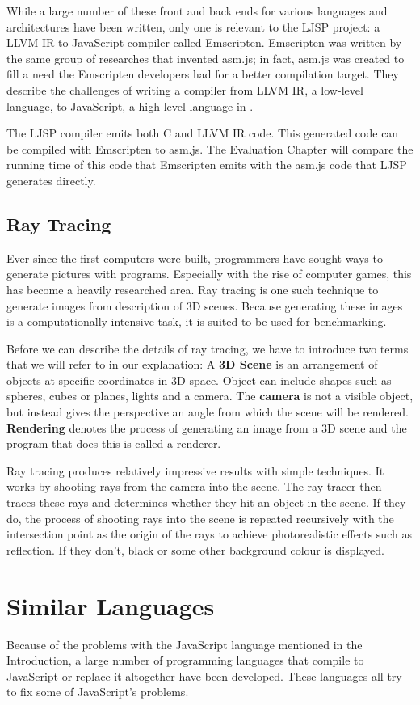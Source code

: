 \documentclass[11pt]{report}
\begin{document}
While a large number of these front and back ends for various languages and architectures have been written, only one is relevant to the LJSP project: a LLVM IR to JavaScript compiler called Emscripten. Emscripten was written by the same group of researches that invented asm.js; in fact, asm.js was created to fill a need the Emscripten developers had for a better compilation target. They describe the challenges of writing a compiler from LLVM IR, a low-level language, to JavaScript, a high-level language in \cite{emscriptenpapar}.

The LJSP compiler emits both C and LLVM IR code. This generated code can be compiled with Emscripten to asm.js. The Evaluation Chapter will compare the running time of this code that Emscripten emits with the asm.js code that LJSP generates directly.

\subsection{Ray Tracing}
Ever since the first computers were built, programmers have sought ways to generate pictures with programs. Especially with the rise of computer games, this has become a heavily researched area. Ray tracing is one such technique to generate images from description of 3D scenes. Because generating these images is a computationally intensive task, it is suited to be used for benchmarking.

Before we can describe the details of ray tracing, we have to introduce two terms that we will refer to in our explanation: A \textbf{3D Scene} is an arrangement of objects at specific coordinates in 3D space. Object can include shapes such as spheres, cubes or planes, lights and a camera. The \textbf{camera} is not a visible object, but instead gives the perspective an angle from which the scene will be rendered. \textbf{Rendering} denotes the process of generating an image from a 3D scene and the program that does this is called a renderer.

Ray tracing produces relatively impressive results with simple techniques. It works by shooting rays from the camera into the scene. The ray tracer then traces these rays and determines whether they hit an object in the scene. If they do, the process of shooting rays into the scene is repeated recursively with the intersection point as the origin of the rays to achieve photorealistic effects such as reflection. If they don't, black or some other background colour is displayed.

\section{Similar Languages}
Because of the problems with the JavaScript language mentioned in the Introduction, a large number of programming languages that compile to JavaScript or replace it altogether have been developed. These languages all try to fix some of JavaScript's problems.
\end{document}
